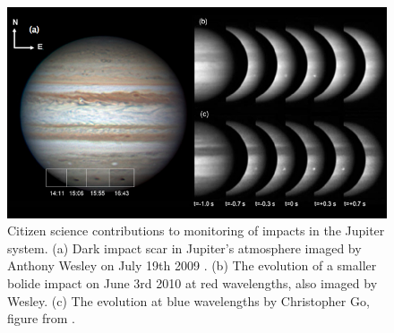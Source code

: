 \documentclass{ar2e}
\begin{document}


\begin{figure}[!ht]
\centering\includegraphics[width=\linewidth]{figs/jupiter-impacts.png}
\caption{Citizen science contributions to monitoring of impacts in the Jupiter
system. (a) Dark impact scar in Jupiter's atmosphere imaged by Anthony
Wesley on July 19th 2009 \citep{10sanchez}. (b) The
evolution of a smaller bolide impact on June 3rd 2010 at red
wavelengths, also imaged by Wesley. (c) The evolution at blue
wavelengths by Christopher Go, figure from \citet{10hueso}.}
\label{fig:jupiter-impacts}
\end{figure}


\end{document}
